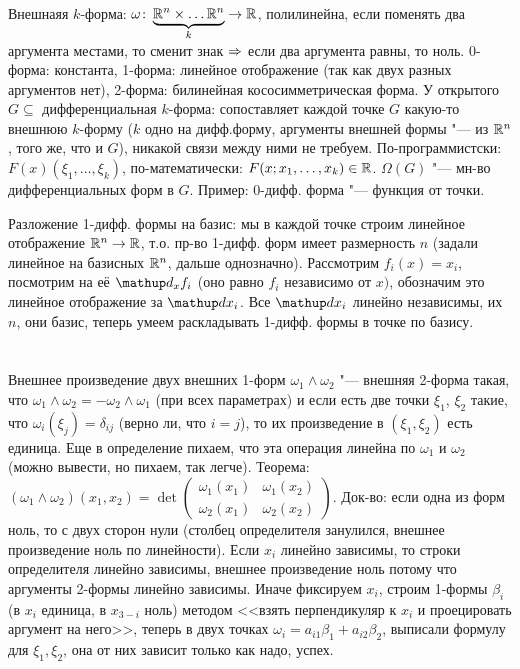 \section{} %
Внешнаяя $k$-форма: $\omega \colon \underbrace{\mathbb{R}^n \times \dots \mathbb{R}^n}_{k} \to \mathbb{R}$, полилинейна, если поменять два аргумента
местами, то сменит знак $\Rightarrow$ если два аргумента равны, то ноль.
0-форма: константа, 1-форма: линейное отображение (так как двух разных аргументов нет), 2-форма: билинейная кососимметрическая форма.
У открытого $G \subseteq $ дифференциальная $k$-форма: сопоставляет каждой точке $G$ какую-то внешнюю $k$-форму ($k$ одно на дифф.форму, аргументы внешней формы "--- из $\mathbb{R}^n$, того же, что и $G$),
никакой связи между ними не требуем.
По-программистски: $F(x)(\xi_1, \dots, \xi_k)$, по-математически: $F(x; x_1, \dots, x_k) \in \mathbb{R}$.
$\Omega(G)$ "--- мн-во дифференциальных форм в $G$.
Пример: 0-дифф. форма "--- функция от точки.

Разложение 1-дифф. формы на базис: мы в каждой точке строим линейное отображение $\mathbb{R}^n \to \mathbb{R}$,
т.о. пр-во 1-дифф. форм имеет размерность $n$ (задали линейное на базисных $\mathbb{R}^n$, дальше однозначно).
Рассмотрим $f_i(x)=x_i$, посмотрим на её $\d_x f_i$ (оно равно $f_i$ независимо от $x)$, обозначим
это линейное отображение за $\d x_i$.
Все $\d x_i$ линейно независимы, их $n$, они базис, теперь умеем раскладывать 1-дифф. формы в точке по базису.

\section{} %
Внешнее произведение двух внешних 1-форм $\omega_1 \wedge \omega_2$ "--- внешняя 2-форма такая, что
$\omega_1 \wedge \omega_2 = -\omega_2 \wedge \omega_1$ (при всех параметрах) и если есть две точки $\xi_1$, $\xi_2$
такие, что $\omega_i(\xi_j) = \delta_{ij}$ (верно ли, что $i = j$), то их произведение в $(\xi_1, \xi_2)$ есть единица.
Еще в определение пихаем, что эта операция линейна по $\omega_1$ и $\omega_2$ (можно вывести, но пихаем, так легче).
Теорема: $(\omega_1 \wedge \omega_2)(x_1, x_2) = \det \begin{pmatrix} \omega_1(x_1) & \omega_1(x_2) \\ \omega_2(x_1) & \omega_2(x_2) \end{pmatrix}$.
Док-во: если одна из форм ноль, то с двух сторон нули (столбец определителя занулился, внешнее произведение ноль по линейности).
Если $x_i$ линейно зависимы, то строки определителя линейно зависимы, внешнее произведение ноль потому что аргументы 2-формы линейно зависимы.
Иначе фиксируем $x_i$, строим 1-формы $\beta_i$ (в $x_i$ единица, в $x_{3-i}$ ноль) методом <<взять перпендикуляр к $x_i$ и проецировать аргумент на него>>,
теперь в двух точках $\omega_i=a_{i1}\beta_1+a_{i2}\beta_2$, выписали формулу для $\xi_1, \xi_2$, она от них зависит только как надо, успех.


